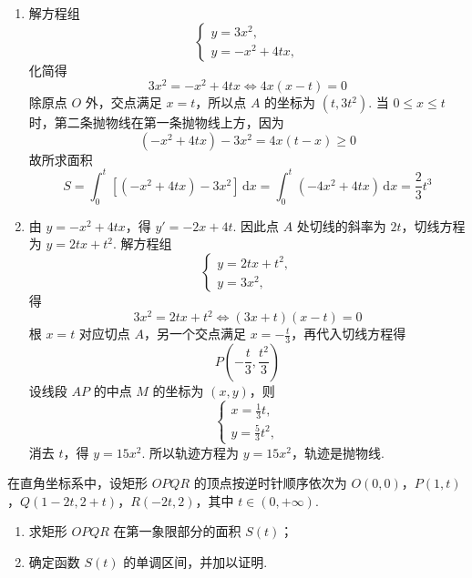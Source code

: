 \begin{solution}
\begin{enumerate}
\item 解方程组
\[
\begin{cases}
y=3x^2,\\
y=-x^2+4tx,
\end{cases}
\]
化简得
\[
3x^2=-x^2+4tx
\Longleftrightarrow 4x(x-t)=0
\]
除原点 \(O\) 外，交点满足 \(x=t\)，所以点 \(A\) 的坐标为 \((t,3t^2)\).
当 \(0\leqslant x\leqslant t\) 时，第二条抛物线在第一条抛物线上方，因为
\[
(-x^2+4tx)-3x^2=4x(t-x)\geqslant 0
\]
故所求面积
\[
S = \int_0^t \left[(-x^2 + 4tx) - 3x^2\right] \,\mathrm{d}x
= \int_0^t (-4x^2 + 4tx) \,\mathrm{d}x
= \frac{2}{3}t^3
\]

\item 由 \(y = -x^2 + 4tx\)，得 \(y' = -2x + 4t\).
因此点 \(A\) 处切线的斜率为 \(2t\)，切线方程为 \(y = 2tx + t^2\).
解方程组
\[
\begin{cases}
y=2tx+t^2,\\
y=3x^2,
\end{cases}
\]
得
\[
3x^2=2tx+t^2
\Longleftrightarrow (3x+t)(x-t)=0
\]
根 \(x=t\) 对应切点 \(A\)，另一个交点满足 \(x=-\frac{t}{3}\)，再代入切线方程得
\[
P\left(-\frac{t}{3},\frac{t^2}{3}\right)
\]
设线段 \(AP\) 的中点 \(M\) 的坐标为 \((x,y)\)，则
\[
\begin{cases}
x=\frac{1}{3}t,\\
y=\frac{5}{3}t^2,
\end{cases}
\]
消去 \(t\)，得 \(y = 15x^2\).
所以轨迹方程为 \(y = 15x^2\)，轨迹是抛物线.
\end{enumerate}
\end{solution}

\begin{problem}
在直角坐标系中，设矩形 \(OPQR\) 的顶点按逆时针顺序依次为 \(O(0,0)\)，\(P(1,t)\)，\(Q(1 - 2t, 2 + t)\)，\(R(-2t,2)\)，其中 \(t \in (0,+\infty)\).

\begin{enumerate}
\item 求矩形 \(OPQR\) 在第一象限部分的面积 \(S(t)\)；
\item 确定函数 \(S(t)\) 的单调区间，并加以证明.
\end{enumerate}
\end{problem}

